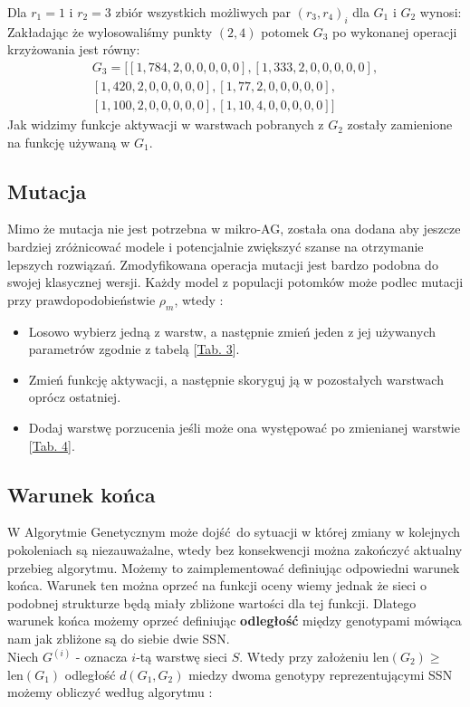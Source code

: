 \documentclass{article}
\begin{document}
Dla $r_1 = 1$ i $r_2 = 3$ zbiór wszystkich możliwych par $(r_3, r_4)_i$ dla $G_1$ i $G_2$ wynosi:
\begin{equation*}
	[(0,2),(0,4),(0,5),(1,2),(1,4),(1,5),(2,4),(2,5),(4,5)]
\end{equation*}
Zakładając że wylosowaliśmy punkty $(2,4)$ potomek $G_3$ po wykonanej operacji krzyżowania
jest równy:
\begin{align*}
	G_3 = \big[[1, 784, 2, 0, 0, 0, 0, 0], [1, 333, 2, 0, 0, 0, 0, 0],\\
	            [1, 420, 2, 0, 0, 0, 0, 0], [1, 77, 2, 0, 0, 0, 0, 0],\\ 
		    [1, 100, 2, 0, 0, 0, 0, 0], [1, 10, 4, 0, 0, 0, 0, 0]\big]
\end{align*}
Jak widzimy funkcje aktywacji w warstwach pobranych z $G_2$ zostały zamienione na funkcję
używaną w $G_1$.\\

\subsection{Mutacja}
Mimo że mutacja nie jest potrzebna w mikro-AG, została ona dodana aby jeszcze bardziej
zróżnicować modele i potencjalnie zwiększyć szanse na otrzymanie lepszych rozwiązań.
Zmodyfikowana operacja mutacji jest bardzo podobna do swojej klasycznej wersji.
Każdy model z populacji potomków może podlec mutacji przy prawdopodobieństwie $\rho_m$, wtedy
\cite{ams}:
\begin{itemize}
	\item Losowo wybierz jedną z warstw, a następnie zmień jeden z jej używanych parametrów
		zgodnie z tabelą [\hyperref[tab:zakres]{Tab. 3}].
	\item Zmień funkcję aktywacji, a następnie skoryguj ją w pozostałych warstwach 
	oprócz ostatniej.
	\item Dodaj warstwę porzucenia jeśli może ona występować po zmienianej warstwie 
	      [\hyperref[tab:rules]{Tab. 4}].
\end{itemize}

\subsection{Warunek końca}
\label{sec:quit}
W Algorytmie Genetycznym może dojść do sytuacji w której zmiany w kolejnych pokoleniach są
niezauważalne, wtedy bez konsekwencji można zakończyć aktualny przebieg algorytmu. Możemy to
zaimplementować definiując odpowiedni warunek końca. Warunek ten można oprzeć na funkcji oceny
wiemy jednak że sieci o podobnej strukturze będą miały zbliżone wartości dla tej funkcji.
Dlatego warunek końca możemy oprzeć definiując \textbf{odległość} między genotypami mówiąca nam
jak zbliżone są do siebie dwie SSN.\\
Niech $G^{(i)}$ - oznacza $i$-tą warstwę sieci $S$. Wtedy przy założeniu 
len$(G_2) \geq$ len$(G_1)$
odległość $d(G_1, G_2)$ miedzy dwoma genotypy reprezentującymi SSN możemy obliczyć według 
algorytmu \cite{ams}:
\end{document}
